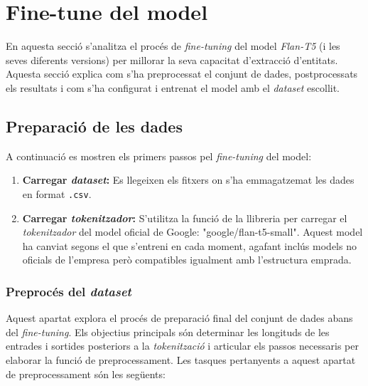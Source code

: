 \section{Fine-tune del model}
En aquesta secció s'analitza el procés de \textit{fine-tuning} del model \textit{Flan-T5} (i les seves diferents versions) per millorar la seva capacitat d'extracció d'entitats. Aquesta secció explica com s'ha preprocessat el conjunt de dades, postprocessats els resultats i com s'ha configurat i entrenat el model amb el \textit{dataset} escollit.

\subsection{Preparació de les dades}
A continuació es mostren els primers passos pel \textit{fine-tuning} del model:

\begin{enumerate}
    \item \textbf{Carregar \textit{dataset}:} Es llegeixen els fitxers on s'ha emmagatzemat les dades en format \texttt{.csv}.
    \item \textbf{Carregar \textit{tokenitzador}:} S'utilitza la funció  de la llibreria  per carregar el \textit{tokenitzador} del model oficial de Google: "google/flan-t5-small". Aquest model ha canviat segons el que s'entreni en cada moment, agafant inclús models no oficials de l'empresa però compatibles igualment amb l'estructura emprada.
\end{enumerate}


\subsubsection{Preprocés del \textit{dataset}}
Aquest apartat explora el procés de preparació final del conjunt de dades abans del \textit{fine-tuning}. Els objectius principals són determinar les longituds de les entrades i sortides posteriors a la \textit{tokenització} i articular els passos necessaris per elaborar la funció de preprocessament. Les tasques pertanyents a aquest apartat de preprocessament són les següents:

